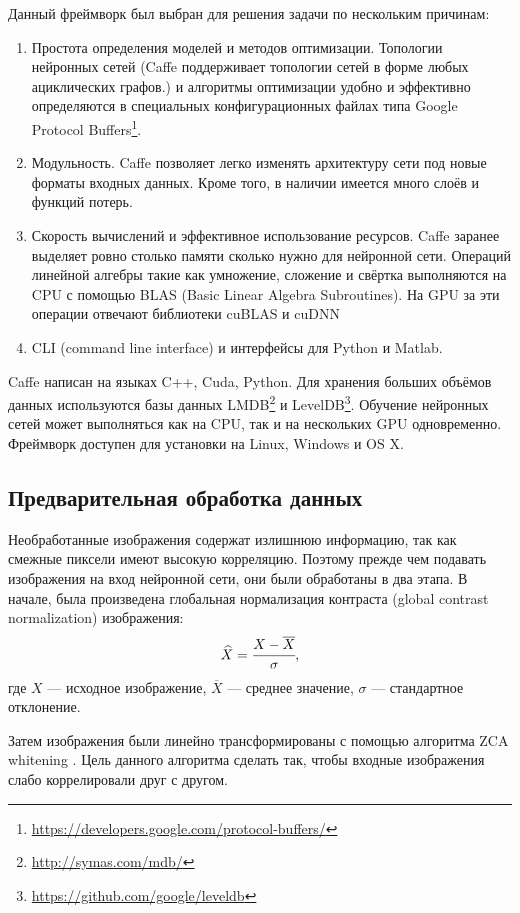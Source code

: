 Данный фреймворк был выбран для решения задачи по нескольким причинам:
\begin{enumerate}
    \item Простота определения моделей и методов оптимизации. Топологии нейронных сетей
    (Caffe поддерживает топологии сетей в форме любых ациклических графов.) и алгоритмы оптимизации удобно и 
    эффективно определяются в специальных конфигурационных файлах типа Google Protocol 
    Buffers\footnote{\url{https://developers.google.com/protocol-buffers/}}. 
    \item Модульность. Caffe позволяет легко изменять архитектуру сети под новые форматы входных данных. Кроме того, в наличии 
    имеется много слоёв и функций потерь.
    \item Скорость вычислений и эффективное использование ресурсов. Caffe заранее выделяет ровно столько памяти сколько нужно для 
    нейронной сети. Операций линейной алгебры такие как умножение, сложение и свёртка выполняются на CPU с помощью BLAS (Basic 
    Linear Algebra Subroutines). На GPU за эти операции отвечают библиотеки cuBLAS и cuDNN 
    \cite{DBLP:journals/corr/ChetlurWVCTCS14}
    \item CLI (command line interface) и интерфейсы для Python и Matlab.
\end{enumerate}

Caffe написан на языках C++, Cuda, Python. Для хранения больших объёмов данных используются базы данных 
LMDB\footnote{\url{http://symas.com/mdb/}} и LevelDB\footnote{\url{https://github.com/google/leveldb}}. Обучение нейронных сетей 
может выполняться как на CPU, так и на нескольких GPU одновременно. Фреймворк доступен для установки на Linux, Windows и OS X.

\subsection{Предварительная обработка данных}
Необработанные изображения содержат излишнюю информацию, так как смежные пиксели имеют высокую корреляцию. Поэтому прежде чем 
подавать изображения на вход нейронной сети, они были обработаны в два этапа. В начале, была произведена глобальная нормализация контраста
(global contrast normalization) изображения:
\[ \widehat{X} = \cfrac{X - \overline{X}}{\sigma},\]
где $X$ --- исходное изображение, $\overline{X}$ --- среднее значение, $\sigma$ --- стандартное отклонение.

Затем изображения были линейно трансформированы с помощью алгоритма ZCA whitening \cite{learningmultiple}.
Цель данного алгоритма сделать так, чтобы входные изображения слабо коррелировали друг с другом.

